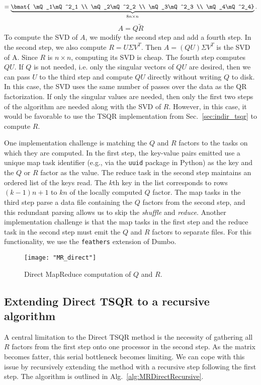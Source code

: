 \documentclass[10pt, conference, compsocconf]{IEEEtran}
\begin{document}
\[
           = \underbrace{\bmat{ \mQ_1\mQ^2_1 \\ \mQ_2\mQ^2_2 \\ \mQ_3\mQ^2_3 \\ \mQ_4\mQ^2_4}}_{8n \times n} .
\]
\[
A = Q\tilde{R}
\]
To compute the SVD of $A$, we modify the second step and add a fourth step.  In the second step, we also compute $R = U\Sigma V^T$.  Then $A = (QU)\Sigma V^T$ is the SVD of A.  Since $R$ is $n \times n$, computing its SVD is cheap.  The fourth step computes $QU$.  If $Q$ is not needed, i.e. only the singular vectors of $QU$ are desired, then we can pass $U$ to the third step and compute $QU$ directly without writing $Q$ to disk.  In this case, the SVD uses the same number of passes over the data as the QR factorization.  If only the singular values are needed, then only the first two steps of the algorithm are needed along with the SVD of $R$.  However, in this case, it would be favorable to use the TSQR implementation from Sec.~\ref{sec:indir_tsqr} to compute $R$.

One implementation challenge is matching the $Q$ and $R$ factors to the tasks on which they are computed.  In the first step, the key-value pairs emitted use a unique map task identifier (e.g., via the \texttt{uuid} package in Python) as the key and the $Q$ or $R$ factor as the value.  The reduce task in the second step maintains an ordered list of the keys read.  The $k$th key in the list corresponds to rows $(k - 1)n + 1$ to $kn$ of the locally computed $Q$ factor.  The map tasks in the third step parse a data file containing the $Q$ factors from the second step, and this redundant parsing allows us to skip the \emph{shuffle} and \emph{reduce}.  Another implementation challenge is that the map tasks in the first step and the reduce task in the second step must emit the $Q$ and $R$ factors to separate files.  For this functionality, we use the \texttt{feathers} extension of Dumbo.

\begin{figure*}
\centering
\texttt{[image: "MR\_direct"]}
\caption{Direct MapReduce computation of $Q$ and $R$.}
\label{fig:MR_full}
\end{figure*}


\subsection{Extending Direct TSQR to a recursive algorithm}\label{sec:recursive}

A central limitation to the Direct TSQR method is the necessity of gathering all $R$ factors from the first step onto one processor in the second step.  As the matrix becomes fatter, this serial bottleneck becomes limiting.  We can cope with this issue by recursively extending the method with a recursive step following the first step.  The algorithm is outlined in Alg.~\ref{alg:MRDirectRecursive}.
\end{document}

